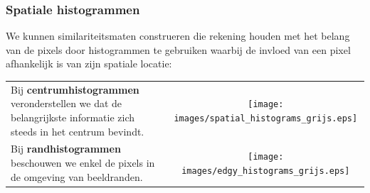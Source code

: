 \documentclass[dutch]{beamer}
\theoremstyle{definition}
\theoremstyle{remark}
\theoremstyle{example}
\begin{document}
\frame
{
  \frametitle{Spatiale histogrammen}
  
  We kunnen similariteitsmaten construeren
  die rekening houden met het belang van de pixels door histogrammen te gebruiken waarbij de
  invloed van een pixel afhankelijk is van zijn spatiale locatie:
  \begin{center}
  \begin{tabular}{@{}lc@{}}
  \begin{minipage}{0.55\textwidth}
  \raggedright
  Bij \textbf{centrumhistogrammen} veronderstellen we dat de belangrijkste informatie
  zich steeds in het centrum bevindt.
  \end{minipage} &
  \begin{minipage}{0.4\textwidth}
  \texttt{[image: images/spatial\_histograms\_grijs.eps]}
  \end{minipage}\vspace{8pt}\\
  \begin{minipage}{0.55\textwidth}
  Bij \textbf{randhistogrammen} beschouwen we enkel de pixels in de omgeving
  van beeldranden.
  \end{minipage} &
  \begin{minipage}{0.4\textwidth}
  \texttt{[image: images/edgy\_histograms\_grijs.eps]}
  \end{minipage}
  \end{tabular}
  \end{center}
}
\frame
\end{document}

